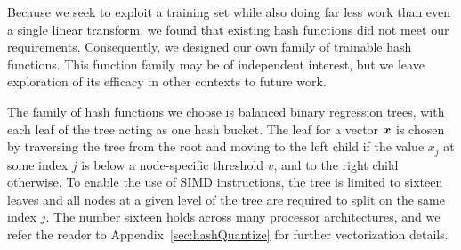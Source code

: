 Because we seek to exploit a training set while also doing far less work than even a single linear transform, we found that existing hash functions did not meet our requirements. Consequently, we designed our own family of trainable hash functions. This function family may be of independent interest, but we leave exploration of its efficacy in other contexts to future work. %

The family of hash functions we choose is balanced binary regression trees, with each leaf of the tree acting as one hash bucket. The leaf for a vector $\bm{x}$ is chosen by traversing the tree from the root and moving to the left child if the value $x_j$ at some index $j$ is below a node-specific threshold $v$, and to the right child otherwise. To enable the use of SIMD instructions, the tree is limited to sixteen leaves and all nodes at a given level of the tree are required to split on the same index $j$. The number sixteen holds across many processor architectures, and we refer the reader to Appendix~\ref{sec:hashQuantize} for further vectorization details.


